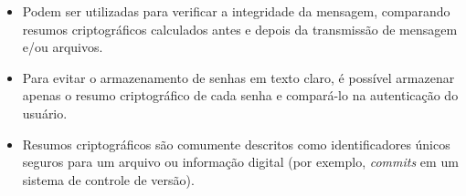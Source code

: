 \documentclass{article}
\begin{document}
\begin{itemize}
\begin{itemize}
\item Podem ser utilizadas para verificar a integridade da mensagem, comparando
resumos criptográficos calculados antes e depois da transmissão de mensagem
e/ou arquivos.

\item Para evitar o armazenamento de senhas em texto claro, é possível
armazenar apenas o resumo criptográfico de cada senha e compará-lo na
autenticação do usuário.

\item Resumos criptográficos são comumente descritos como identificadores únicos
seguros para um arquivo ou informação digital (por exemplo, \emph{commits} em um
sistema de controle de versão).

\end{itemize}

\end{itemize}



\end{document}

